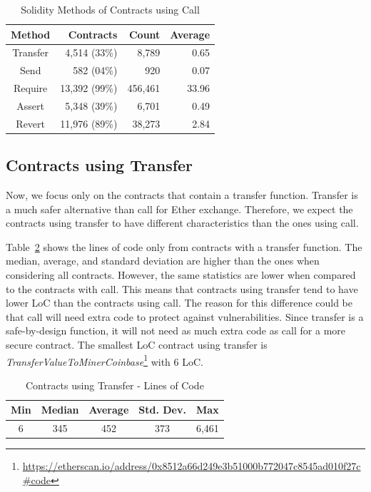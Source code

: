 \documentclass[10pt,conference]{IEEEtran}
\begin{document}
\begin{table}
\center
  \caption{Solidity Methods of Contracts using Call}
  \label{tab:call}
  \begin{tabular}{crrr}
    \hline
    Method & Contracts & Count & Average\\
    \hline
    Transfer & 4,514 (33\%) & 8,789 & 0.65\\
    Send &582 (04\%) & 920 & 0.07\\
    Require &13,392 (99\%) & 456,461 & 33.96 \\
    Assert & 5,348 (39\%) & 6,701 & 0.49\\
    Revert & 11,976 (89\%) & 38,273 & 2.84\\
\end{tabular}
\end{table}

\subsection{Contracts using Transfer}

Now, we focus only on the contracts that contain a transfer function. Transfer is a much safer alternative than call for Ether exchange. Therefore, we expect the contracts using transfer to have different characteristics than the ones using call.

Table~\ref{tab:transfer-loc} shows the lines of code only from contracts with a transfer function. The median, average, and standard deviation are higher than the ones when considering all contracts. However, the same statistics are lower when compared to the contracts with call. This means that contracts using transfer tend to have lower LoC than the contracts using call. The reason for this difference could be that call will need extra code to protect against vulnerabilities. Since transfer is a safe-by-design function, it will not need as much extra code as call for a more secure contract. The smallest LoC contract using transfer is \textit{TransferValueToMinerCoinbase}\footnote{\url{https://etherscan.io/address/0x8512a66d249e3b51000b772047c8545ad010f27c\#code}} with 6 LoC.

\begin{table}[t]
\center
  \caption{Contracts using Transfer - Lines of Code}
  \label{tab:transfer-loc}
  \begin{tabular}{c c c c c}
    \hline
    Min & Median & Average & Std. Dev. & Max \\
    \hline
   6 & 345 & 452 & 373 & 6,461 \\
  \hline
\end{tabular}
\end{table}
\end{document}
